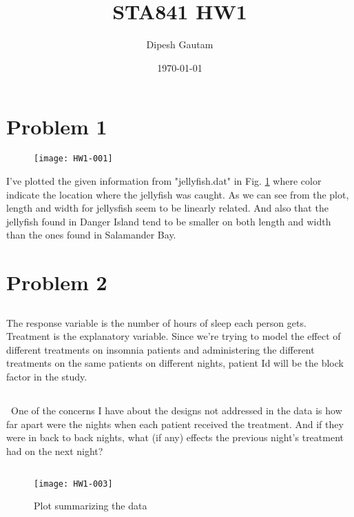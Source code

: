 \documentclass{article}
\begin{document}

\title{STA841 HW1}
\author{Dipesh Gautam}
\date{\today}
\maketitle

\section{Problem 1}
\begin{figure}[ht]
\texttt{[image: HW1-001]}

\label{fig:1}
\caption{}
\end{figure}

I've plotted the given information from "jellyfish.dat" in Fig. \ref{fig:1} where color indicate the location where the jellyfish was caught. As we can see from the plot, length and width for jellysfish seem to be linearly related. And also that the jellyfish found in Danger Island tend to be smaller on both length and width than the ones found in Salamander Bay.

\section{Problem 2}
\subsection{}
The response variable is the number of hours of sleep each person gets. Treatment is the explanatory variable. Since we're trying to model the effect of different treatments on insomnia patients and administering the different treatments on the same patients on different nights, patient Id will be the block factor in the study.\\
\subsection{}\
One of the concerns I have about the designs not addressed in the data is how far apart were the nights when each patient received the treatment. And if they were in back to back nights, what (if any) effects the previous night's treatment had on the next night?


\subsection{}


\begin{figure}[h]
\texttt{[image: HW1-003]}
\caption{Plot summarizing the data}
\label{fig:box}
\end{figure}
\end{document}
